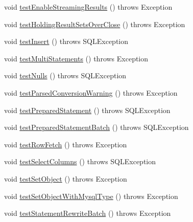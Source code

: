 \begin{DoxyCompactItemize}
\item 
void \mbox{\hyperlink{classtestsuite_1_1simple_1_1_statements_test_a40a8de362a86f57fdaf1b7425f426342}{test\+Enable\+Streaming\+Results}} ()  throws Exception 
\item 
void \mbox{\hyperlink{classtestsuite_1_1simple_1_1_statements_test_ade8548bde08b58368b93161e17bcafc4}{test\+Holding\+Result\+Sets\+Over\+Close}} ()  throws Exception 
\item 
void \mbox{\hyperlink{classtestsuite_1_1simple_1_1_statements_test_aa871804c07cb4e445f297c48110ceb16}{test\+Insert}} ()  throws S\+Q\+L\+Exception 
\item 
void \mbox{\hyperlink{classtestsuite_1_1simple_1_1_statements_test_a8be371b068b81e39350ba4e2b1287800}{test\+Multi\+Statements}} ()  throws Exception 
\item 
void \mbox{\hyperlink{classtestsuite_1_1simple_1_1_statements_test_a7c77d0eff3cc940b6335415ad52cfea8}{test\+Nulls}} ()  throws S\+Q\+L\+Exception 
\item 
void \mbox{\hyperlink{classtestsuite_1_1simple_1_1_statements_test_aee8ef1929fdcc279a8b3910491b866c5}{test\+Parsed\+Conversion\+Warning}} ()  throws Exception 
\item 
void \mbox{\hyperlink{classtestsuite_1_1simple_1_1_statements_test_a0c28b4879ac2802d4bfa373d496594fe}{test\+Prepared\+Statement}} ()  throws S\+Q\+L\+Exception 
\item 
void \mbox{\hyperlink{classtestsuite_1_1simple_1_1_statements_test_ae0e024f9e63cf3d9c9a0dd32babd75ce}{test\+Prepared\+Statement\+Batch}} ()  throws S\+Q\+L\+Exception 
\item 
void \mbox{\hyperlink{classtestsuite_1_1simple_1_1_statements_test_a19fe5f56dfa23d7df03d0654d9cf5737}{test\+Row\+Fetch}} ()  throws Exception 
\item 
void \mbox{\hyperlink{classtestsuite_1_1simple_1_1_statements_test_ad40b0d788d89515d836cdbee5e748fff}{test\+Select\+Columns}} ()  throws S\+Q\+L\+Exception 
\item 
void \mbox{\hyperlink{classtestsuite_1_1simple_1_1_statements_test_acf80cede1ff53fcdebca2de611a1c015}{test\+Set\+Object}} ()  throws Exception 
\item 
void \mbox{\hyperlink{classtestsuite_1_1simple_1_1_statements_test_aa625fdb1fdc9d5a572973b63a35a0b05}{test\+Set\+Object\+With\+Mysql\+Type}} ()  throws Exception 
\item 
void \mbox{\hyperlink{classtestsuite_1_1simple_1_1_statements_test_a30f552176c9ad0cd34ab51a8b90ab0ee}{test\+Statement\+Rewrite\+Batch}} ()  throws Exception 

\end{DoxyCompactItemize}
